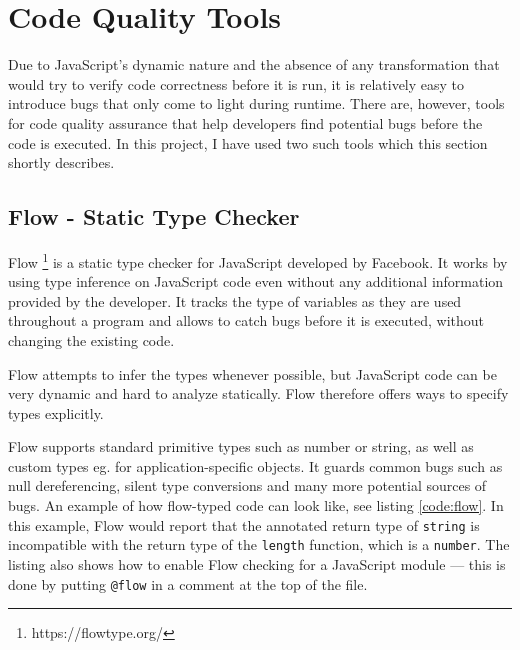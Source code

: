 \section{Code Quality Tools}

Due to JavaScript's dynamic nature and the absence of any transformation that would try to verify code correctness before it is run, it is relatively easy to introduce bugs that only come to light during runtime. There are, however, tools for code quality assurance that help developers find potential bugs before the code is executed. In this project, I have used two such tools which this section shortly describes.

\subsection{Flow - Static Type Checker}

Flow \footnote{https://flowtype.org/}   is a static type checker for JavaScript developed by Facebook. It works by using type inference on JavaScript code even without any additional information provided by the developer. It tracks the type of variables as they are used throughout a program and allows to catch bugs before it is executed, without changing the existing code. 

Flow attempts to infer the types whenever possible, but JavaScript code can be very dynamic and hard to analyze statically. Flow therefore offers ways to specify types explicitly.

Flow supports standard primitive types such as number or string, as well as custom types eg. for application-specific objects. It guards common bugs such as null dereferencing, silent type conversions and many more potential sources of bugs. An example of how flow-typed code can look like, see listing \ref{code:flow}. In this example, Flow would report that the annotated return type of \texttt{string} is incompatible with the return type of the \texttt{length} function, which is a \texttt{number}. The listing also shows how to enable Flow checking for a JavaScript module --- this is done by putting \texttt{@flow} in a comment at the top of the file.






